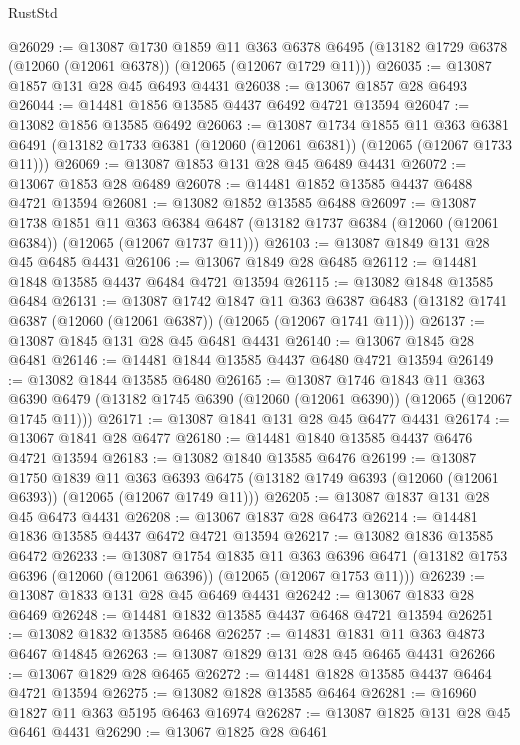 \begin{lexlean}{RustStd}
\begin{coremodule}
@26029 := @13087
    @1730
    @1859
    @11
    @363
    @6378
    @6495
    (@13182 @1729 @6378 (@12060 (@12061 @6378)) (@12065 (@12067 @1729 @11)))
@26035 := @13087 @1857 @131 @28 @45 @6493 @4431
@26038 := @13067 @1857 @28 @6493
@26044 := @14481 @1856 @13585 @4437 @6492 @4721 @13594
@26047 := @13082 @1856 @13585 @6492
@26063 := @13087
    @1734
    @1855
    @11
    @363
    @6381
    @6491
    (@13182 @1733 @6381 (@12060 (@12061 @6381)) (@12065 (@12067 @1733 @11)))
@26069 := @13087 @1853 @131 @28 @45 @6489 @4431
@26072 := @13067 @1853 @28 @6489
@26078 := @14481 @1852 @13585 @4437 @6488 @4721 @13594
@26081 := @13082 @1852 @13585 @6488
@26097 := @13087
    @1738
    @1851
    @11
    @363
    @6384
    @6487
    (@13182 @1737 @6384 (@12060 (@12061 @6384)) (@12065 (@12067 @1737 @11)))
@26103 := @13087 @1849 @131 @28 @45 @6485 @4431
@26106 := @13067 @1849 @28 @6485
@26112 := @14481 @1848 @13585 @4437 @6484 @4721 @13594
@26115 := @13082 @1848 @13585 @6484
@26131 := @13087
    @1742
    @1847
    @11
    @363
    @6387
    @6483
    (@13182 @1741 @6387 (@12060 (@12061 @6387)) (@12065 (@12067 @1741 @11)))
@26137 := @13087 @1845 @131 @28 @45 @6481 @4431
@26140 := @13067 @1845 @28 @6481
@26146 := @14481 @1844 @13585 @4437 @6480 @4721 @13594
@26149 := @13082 @1844 @13585 @6480
@26165 := @13087
    @1746
    @1843
    @11
    @363
    @6390
    @6479
    (@13182 @1745 @6390 (@12060 (@12061 @6390)) (@12065 (@12067 @1745 @11)))
@26171 := @13087 @1841 @131 @28 @45 @6477 @4431
@26174 := @13067 @1841 @28 @6477
@26180 := @14481 @1840 @13585 @4437 @6476 @4721 @13594
@26183 := @13082 @1840 @13585 @6476
@26199 := @13087
    @1750
    @1839
    @11
    @363
    @6393
    @6475
    (@13182 @1749 @6393 (@12060 (@12061 @6393)) (@12065 (@12067 @1749 @11)))
@26205 := @13087 @1837 @131 @28 @45 @6473 @4431
@26208 := @13067 @1837 @28 @6473
@26214 := @14481 @1836 @13585 @4437 @6472 @4721 @13594
@26217 := @13082 @1836 @13585 @6472
@26233 := @13087
    @1754
    @1835
    @11
    @363
    @6396
    @6471
    (@13182 @1753 @6396 (@12060 (@12061 @6396)) (@12065 (@12067 @1753 @11)))
@26239 := @13087 @1833 @131 @28 @45 @6469 @4431
@26242 := @13067 @1833 @28 @6469
@26248 := @14481 @1832 @13585 @4437 @6468 @4721 @13594
@26251 := @13082 @1832 @13585 @6468
@26257 := @14831 @1831 @11 @363 @4873 @6467 @14845
@26263 := @13087 @1829 @131 @28 @45 @6465 @4431
@26266 := @13067 @1829 @28 @6465
@26272 := @14481 @1828 @13585 @4437 @6464 @4721 @13594
@26275 := @13082 @1828 @13585 @6464
@26281 := @16960 @1827 @11 @363 @5195 @6463 @16974
@26287 := @13087 @1825 @131 @28 @45 @6461 @4431
@26290 := @13067 @1825 @28 @6461

\end{coremodule}
\end{lexlean}
